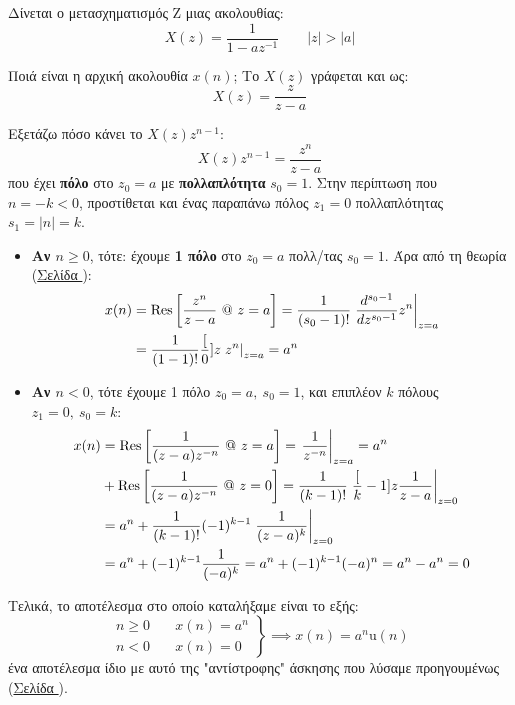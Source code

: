 \documentclass[11pt,a4paper,notitlepage,fleqn,draft]{article}
\begin{document}
\begin{exercise}
	Δίνεται ο μετασχηματισμός Z μιας ακολουθίας:\[
	X(z) = \frac{1}{1-az^{-1}} \qquad |z|>|a|
	\]
	
	Ποιά είναι η αρχική ακολουθία \( x(n) \);
	\tcblower
	Το \( X(z) \) γράφεται και ως:
	\[
	X(z) = \frac{z}{z-a}
	\]
	
	Εξετάζω πόσο κάνει το \( X(z)z^{n-1} \):
	\[
	X(z)z^{n-1} = \frac{z^n}{z-a}
	\]
	που έχει \textbf{πόλο} στο \( z_0 = a \) με \textbf{πολλαπλότητα} \( s_0 = 1 \). Στην περίπτωση που \( n = -k <0 \), προστίθεται και ένας παραπάνω πόλος \( z_1=0 \) πολλαπλότητας
	\( s_1 = |n|= k \).
	
	\begin{itemize}
		\item \textbf{Αν \( n\geq 0 \)}, τότε:
		έχουμε \textbf{1 πόλο} στο \( z_0=a \) πολλ/τας \( s_0=1 \). Άρα από τη θεωρία (\hyperref[sec:rescalc]{Σελίδα \pageref*{sec:rescalc}}):
		\begin{align*}
			x(n) &= \operatorname{Res}\left[
			\frac{z^n}{z-a} \ @ \ z=a
			\right] = \frac{1}{(s_0-1)!} \left. \frac{d^{s_0-1}}{d  z^{s_0-1}} z^n \right|_{z=a}
			\\ &= \frac{1}{(1-1)!}\frac{[}{0}]{}{z}\left. z^n \right|_{z=a}
			= a^n
		\end{align*}
		\item \textbf{Αν \( n < 0 \)}, τότε έχουμε 1 πόλο \( z_0=a,\ s_0=1 \), και επιπλέον \( k \) πόλους \( z_1=0,\ s_0=k \):
		\begin{align*}
			x(n) &= \operatorname{Res}\left[
			\frac{1}{(z-a)z^{-n}}\ @ \ z=a
			\right] = \left.\frac{1}{z^{-n}}\right|_{z=a} = a^n
			\\ &+ \operatorname{Res}\left[
			\frac{1}{(z-a)z^{-n}}\ @ \ z=0
			\right] = \frac{1}{(k-1)!}\left.\frac{[}{k}-1]{}{z} \frac{1}{z-a}\right|_{z=0}
			\\ &= a^n + \frac{1}{(k-1)!}(-1)^{k-1}\left.\frac{1}{(z-a)^k}\right|_{z=0}
			\\ &= a^n + (-1)^{k-1} \frac{1}{(-a)^k}
			= a^n + (-1)^{k-1}(-a)^n = a^n - a^n = 0
		\end{align*}
	\end{itemize}

    Τελικά, το αποτέλεσμα στο οποίο καταλήξαμε είναι το εξής:
    \[
    \left.\begin{aligned}
    n \geq 0 &\quad x(n)=a^n\\
    n < 0 &\quad x(n) = 0
    \end{aligned} \right\rbrace \implies x(n) = a^n\mathrm{u}(n)
    \]
    ένα αποτέλεσμα ίδιο με αυτό της "αντίστροφης" άσκησης που λύσαμε προηγουμένως (\hyperref[sec:findz1]{Σελίδα \pageref*{sec:findz1}}).
\end{exercise}
\end{document}
